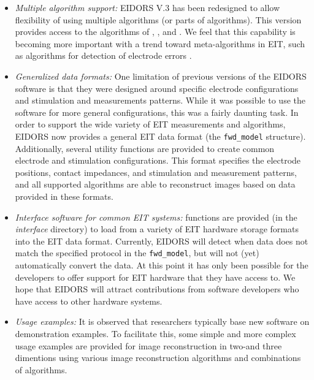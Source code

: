 \documentclass[12pt]{iopart}
\begin{document}
\begin{itemize}

  \item {\em Multiple algorithm support:}
EIDORS V.3 has been redesigned to allow flexibility of
using multiple algorithms (or parts of algorithms). 
This version provides access to the algorithms of
\cite{Adler_and_Guardo_1996}, \cite{Polydorides_and_Lionheart_2002},
\cite{Soleimani_etal_2005} and \cite{Vauhkonen_etal_2000}.
We feel that this capability is becoming more
important with a trend toward meta-algorithms
in EIT, such as algorithms for detection of
electrode errors \cite{Asfaw_and_Adler_2005}. 

  \item {\em Generalized data formats:}
One limitation of previous versions of the EIDORS software
is that they were designed around specific electrode configurations
and stimulation and measurements patterns. While it was possible
to use the software for more general configurations, this was 
a fairly daunting task. In order to support the wide
variety of EIT measurements and algorithms, EIDORS now provides
a general EIT data format (the {\tt fwd\_model} structure).
Additionally, several utility functions are provided to
create common electrode and stimulation configurations.
This format specifies the electrode positions, contact impedances,
and stimulation and measurement patterns, and all supported
algorithms are able to reconstruct images based on data
provided in these formats.

  \item {\em Interface software for common EIT systems:}
functions are provided (in the {\em interface} directory) to load
from a variety of EIT hardware storage formats into the
EIT data format. Currently, EIDORS will detect when data
does not match the specified protocol in the {\tt fwd\_model},
but will not (yet) automatically convert the data.
At this point it has only been possible for the developers to 
offer support for EIT hardware that they have access
to. We hope that EIDORS will attract contributions from
software developers who have access to other hardware
systems.

  \item {\em Usage examples:}
It is observed that researchers typically base new software on
demonstration examples. To facilitate this, some simple and more
complex usage examples are provided for image reconstruction
in two-and three dimentions using various image reconstruction
algorithms and combinations of algorithms.


\end{itemize}
\end{document}

